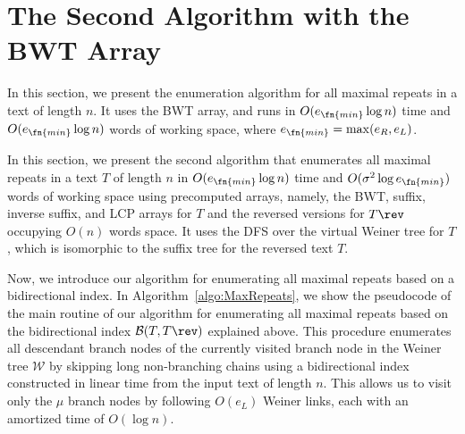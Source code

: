 

\section{The Second Algorithm with the BWT Array}
\label{sec:algo:reverse}

In this section, we present the enumeration algorithm for all maximal repeats in a text  of length $n$. It uses the BWT array, and runs in $O(e_\fn{min}\log n)$ time and $O(e_\fn{min}\log n)$ words of working space, where $e_\fn{min} = \max(e_R, e_L)$.

In this section, we present the second algorithm that enumerates all maximal repeats in a text $T$ of length $n$ in $O(e_\fn{min} \log n)$ time and $O(\sigma^2 \log e_\fn{min})$ words of working space using precomputed arrays, namely, the BWT, suffix, inverse suffix, and LCP arrays for $T$ and the reversed versions for $T\rev$ occupying $O(n)$ words space.
It uses the DFS over the virtual Weiner tree for $T$, which is isomorphic to the suffix tree for the reversed text $T$.



Now, we introduce our algorithm for enumerating all maximal repeats based on a bidirectional index.
In Algorithm~\ref{algo:MaxRepeats}, we show the pseudocode of the main routine of our algorithm for enumerating all maximal repeats based on the bidirectional index $\mathcal B(T,T\rev)$ explained above. 
This procedure enumerates all descendant branch nodes of the currently visited branch node in the Weiner tree $\mathcal W$ by skipping long non-branching chains using a bidirectional index constructed in linear time from the input text of length $n$. This allows us to visit only the $\mu$ branch nodes by following $O(e_L)$ Weiner links, each with an amortized time of $O(\log n)$.

